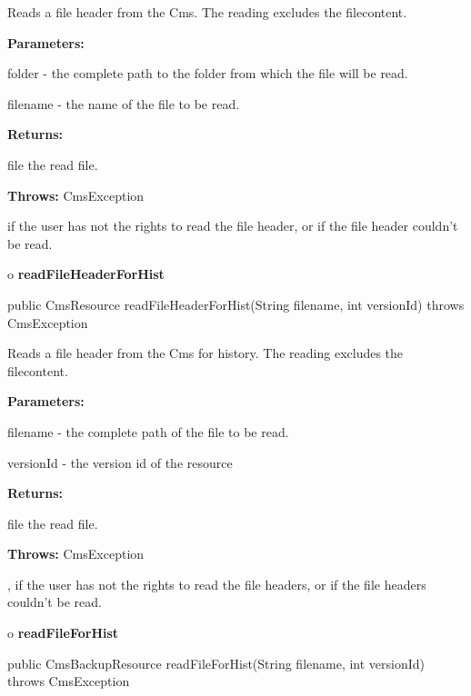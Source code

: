 \begin{description}
\htmlDD Reads a file header from the Cms. \htmlBR
The reading excludes the filecontent.

\begin{description}
\item {\bf Parameters:}

folder - the complete path to the folder from which the file will be read.

filename - the name of the file to be read.
\item {\bf Returns:}

file the read file.
\item {\bf Throws:} CmsException

if the user has not the rights to read the file header, or if the file header
couldn't be read.
\end{description}

\end{description}

o {\bf readFileHeaderForHist}

\begin{PRE}
 public CmsResource readFileHeaderForHist(String filename,
                                          int versionId) throws CmsException
\end{PRE}

\begin{description}
\htmlDD Reads a file header from the Cms for history. \htmlBR
The reading excludes the filecontent.

\begin{description}
\item {\bf Parameters:}

filename - the complete path of the file to be read.

versionId - the version id of the resource
\item {\bf Returns:}

file the read file.
\item {\bf Throws:} CmsException

, if the user has not the rights to read the file headers, or if the file
headers couldn't be read.
\end{description}

\end{description}

o {\bf readFileForHist}

\begin{PRE}
 public CmsBackupResource readFileForHist(String filename,
                                          int versionId) throws CmsException
\end{PRE}

